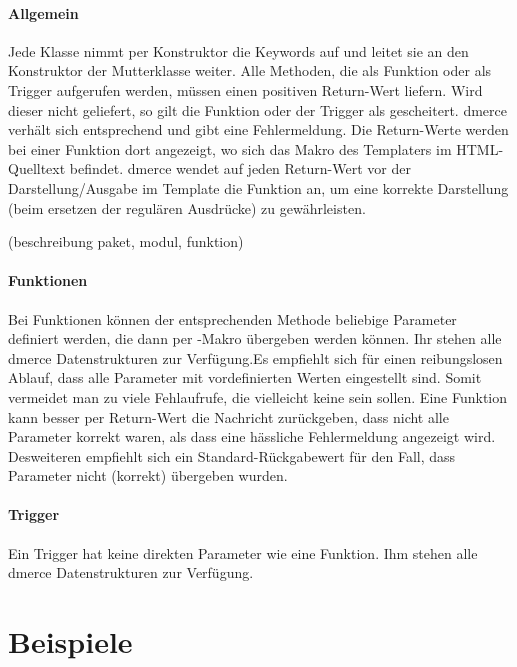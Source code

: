 \paragraph{Allgemein}

Jede Klasse nimmt per Konstruktor die Keywords  auf und
leitet sie an den Konstruktor der Mutterklasse
 weiter. Alle Methoden, die als Funktion
oder als Trigger aufgerufen werden, m\"ussen einen positiven
Return-Wert liefern. Wird dieser nicht geliefert, so gilt die Funktion
oder der Trigger als gescheitert. dmerce verh\"alt sich entsprechend
und gibt eine Fehlermeldung. Die Return-Werte werden bei einer
Funktion dort angezeigt, wo sich das Makro des Templaters im
HTML-Quelltext befindet. dmerce wendet auf jeden Return-Wert vor der
Darstellung/Ausgabe im Template die Funktion  an, um
eine korrekte Darstellung (beim ersetzen der regul\"aren Ausdr\"ucke)
zu gew\"ahrleisten.

(beschreibung paket, modul, funktion)

\paragraph{Funktionen}

Bei Funktionen k\"onnen der entsprechenden Methode beliebige Parameter
definiert werden, die dann per -Makro \"ubergeben
werden k\"onnen. Ihr stehen alle dmerce Datenstrukturen
 zur Verf\"ugung.Es
empfiehlt sich f\"ur einen reibungslosen Ablauf, dass alle Parameter
mit vordefinierten Werten eingestellt sind. Somit vermeidet man zu
viele Fehlaufrufe, die vielleicht keine sein sollen.  Eine Funktion
kann besser per Return-Wert die Nachricht zur\"uckgeben, dass nicht
alle Parameter korrekt waren, als dass eine h\"assliche Fehlermeldung
angezeigt wird. Desweiteren empfiehlt sich ein Standard-R\"uckgabewert
f\"ur den Fall, dass Parameter nicht (korrekt) \"ubergeben wurden.

\paragraph{Trigger}

Ein Trigger hat keine direkten Parameter wie eine Funktion. Ihm stehen
alle dmerce Datenstrukturen
 zur Verf\"ugung.

\section{Beispiele}

